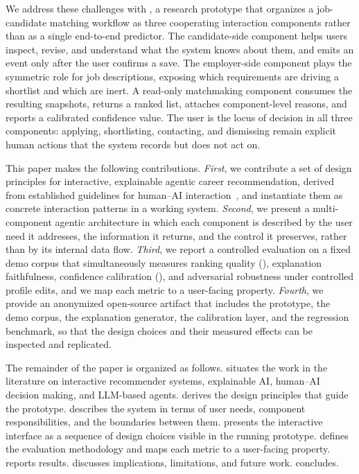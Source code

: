 We address these challenges with \JobMatch, a research prototype that organizes a job-candidate matching workflow as three cooperating interaction components rather than as a single end-to-end predictor.
The candidate-side component helps users inspect, revise, and understand what the system knows about them, and emits an event only after the user confirms a save.
The employer-side component plays the symmetric role for job descriptions, exposing which requirements are driving a shortlist and which are inert.
A read-only matchmaking component consumes the resulting snapshots, returns a ranked list, attaches component-level reasons, and reports a calibrated confidence value.
The user is the locus of decision in all three components: applying, shortlisting, contacting, and dismissing remain explicit human actions that the system records but does not act on.

This paper makes the following contributions.
\emph{First}, we contribute a set of design principles for interactive, explainable agentic career recommendation, derived from established guidelines for human--{AI} interaction~\cite{amershi2019guidelines,shneiderman2020human,horvitz2019ai}, and instantiate them as concrete interaction patterns in a working system.
\emph{Second}, we present a multi-component agentic architecture in which each component is described by the user need it addresses, the information it returns, and the control it preserves, rather than by its internal data flow.
\emph{Third}, we report a controlled evaluation on a fixed demo corpus that simultaneously measures ranking quality (\ndcg), explanation faithfulness, confidence calibration (\ece), and adversarial robustness under controlled profile edits, and we map each metric to a user-facing property.
\emph{Fourth}, we provide an anonymized open-source artifact that includes the prototype, the demo corpus, the explanation generator, the calibration layer, and the regression benchmark, so that the design choices and their measured effects can be inspected and replicated.

The remainder of the paper is organized as follows.
 situates the work in the literature on interactive recommender systems, explainable {AI}, human--{AI} decision making, and LLM-based agents.
 derives the design principles that guide the prototype.
 describes the system in terms of user needs, component responsibilities, and the boundaries between them.
 presents the interactive interface as a sequence of design choices visible in the running prototype.
 defines the evaluation methodology and maps each metric to a user-facing property.
 reports results.
 discusses implications, limitations, and future work.
 concludes.
